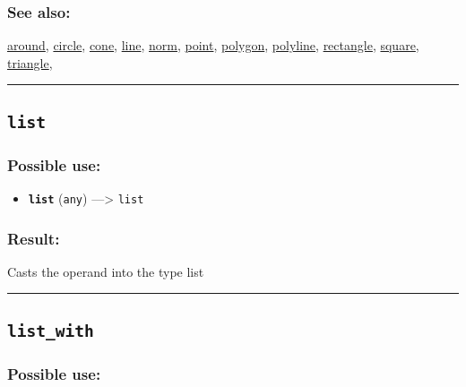 \documentclass[]{book}
\providecommand{\tightlist}{%
  \setlength{\itemsep}{0pt}\setlength{\parskip}{0pt}}
\theoremstyle{definition}
\theoremstyle{definition}
\theoremstyle{definition}
\theoremstyle{remark}
\begin{document}
\subsubsection{See also:}\label{see-also-126}

\href{OperatorsAA\#around}{around}, \href{OperatorsBC\#circle}{circle},
\href{OperatorsBC\#cone}{cone}, \href{OperatorsIM\#line}{line},
\href{OperatorsNR\#norm}{norm}, \href{OperatorsNR\#point}{point},
\href{OperatorsNR\#polygon}{polygon},
\href{OperatorsNR\#polyline}{polyline},
\href{OperatorsNR\#rectangle}{rectangle},
\href{OperatorsSZ\#square}{square},
\href{OperatorsSZ\#triangle}{triangle},

\begin{center}\rule{0.5\linewidth}{\linethickness}\end{center}

\subsection{\texorpdfstring{\texttt{list}}{list}}\label{list}

\subsubsection{Possible use:}\label{possible-use-323}

\begin{itemize}
\tightlist
\item
  \textbf{\texttt{list}} (\texttt{any}) ---\textgreater{} \texttt{list}
\end{itemize}

\subsubsection{Result:}\label{result-313}

Casts the operand into the type list

\begin{center}\rule{0.5\linewidth}{\linethickness}\end{center}

\subsection{\texorpdfstring{\texttt{list\_with}}{list\_with}}\label{list_with}

\subsubsection{Possible use:}\label{possible-use-324}
\end{document}
